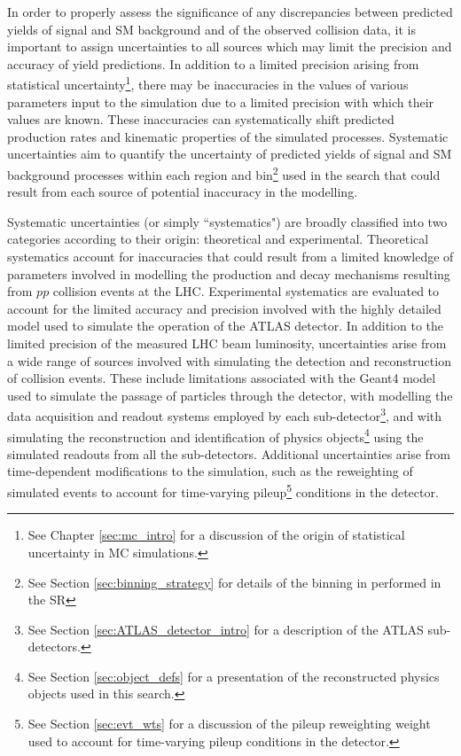 \label{chapter:systematics}

In order to properly assess the significance of any discrepancies between predicted yields of signal and SM background and of the observed collision data, it is important to assign uncertainties to all sources which may limit the precision and accuracy of yield predictions. In addition to a limited precision arising from statistical uncertainty\footnote{See Chapter \ref{sec:mc_intro} for a discussion of the origin of statistical uncertainty in MC simulations.}, there may be inaccuracies in the values of various parameters input to the simulation due to a limited precision with which their values are known. These inaccuracies can systematically shift predicted production rates and kinematic properties of the simulated processes. Systematic uncertainties aim to quantify the uncertainty of  predicted yields of signal and SM background processes within each region and bin\footnote{See Section \ref{sec:binning_strategy} for details of the binning in \minms performed in the SR} used in the search that could result from each source of potential inaccuracy in the modelling. 

Systematic uncertainties (or simply ``systematics") are broadly classified into two categories according to their origin: theoretical and experimental. Theoretical systematics account for inaccuracies that could result from a limited knowledge of parameters involved in modelling the production and decay mechanisms resulting from \(pp\) collision events at the LHC. Experimental systematics are evaluated to account for the limited accuracy and precision involved with the highly detailed model used to simulate the operation of the ATLAS detector. In addition to the limited precision of the measured LHC beam luminosity, uncertainties arise from a wide range of sources involved with simulating the detection and reconstruction of collision events. These include limitations associated with the Geant4 model \cite{Geant4} used to simulate the passage of particles through the detector, with modelling the data acquisition and readout systems employed by each sub-detector\footnote{See Section \ref{sec:ATLAS_detector_intro} for a description of the ATLAS sub-detectors.}, and with simulating the reconstruction and identification of physics objects\footnote{See Section \ref{sec:object_defs} for a presentation of the reconstructed physics objects used in this search.} using the simulated readouts from all the sub-detectors. Additional uncertainties arise from time-dependent modifications to the simulation, such as the reweighting of simulated events to account for time-varying pileup\footnote{See Section \ref{sec:evt_wts} for a discussion of the pileup reweighting weight used to account for time-varying pileup conditions in the detector.} conditions in the detector.

